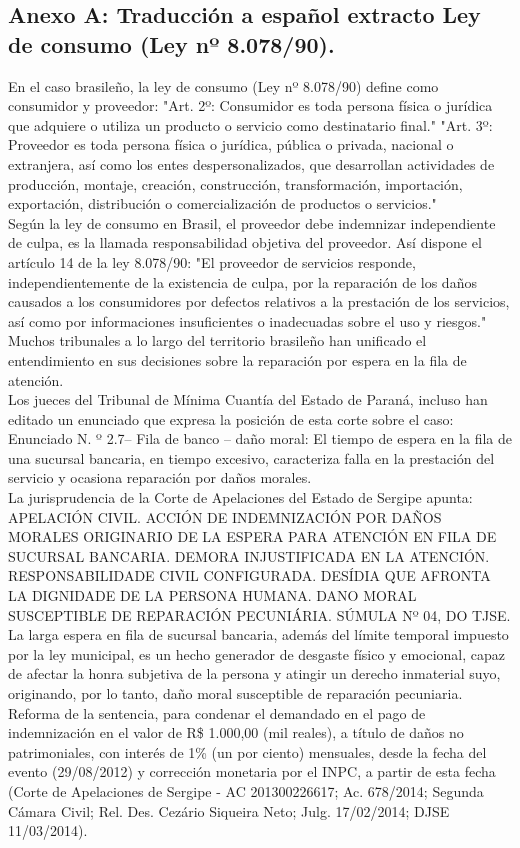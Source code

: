 \subsection*{Anexo A: Traducción a español extracto Ley de consumo (Ley nº 8.078/90).}

En el caso brasileño, la ley de consumo (Ley nº 8.078/90) define como consumidor y proveedor:
"Art. 2º: Consumidor es toda persona física o jurídica que adquiere o utiliza un producto o servicio como destinatario final."
"Art. 3º: Proveedor es toda persona física o jurídica, pública o privada, nacional o extranjera, así como los entes despersonalizados, que desarrollan actividades de producción, montaje, creación, construcción, transformación, importación, exportación, distribución o comercialización de productos o servicios."\\

Según la ley de consumo en Brasil, el proveedor debe indemnizar independiente de culpa, es la llamada responsabilidad objetiva del proveedor. Así dispone el artículo 14 de la ley 8.078/90: "El proveedor de servicios responde, independientemente de la existencia de culpa, por la reparación de los daños causados a los consumidores por defectos relativos a la prestación de los servicios, así como por informaciones insuficientes o inadecuadas sobre el uso y riesgos."\\

Muchos tribunales a lo largo del territorio brasileño han unificado el entendimiento en sus decisiones sobre la reparación por espera en la fila de atención.\\

Los jueces del Tribunal de Mínima Cuantía del Estado de Paraná, incluso han editado un enunciado que expresa la posición de esta corte sobre el caso:
Enunciado N. º 2.7– Fila de banco – daño moral: El tiempo de espera en la fila de una sucursal bancaria, en tiempo excesivo, caracteriza falla en la prestación del servicio y ocasiona reparación por daños morales.\\

La jurisprudencia de la Corte de Apelaciones del Estado de Sergipe apunta:
APELACIÓN CIVIL. ACCIÓN DE INDEMNIZACIÓN POR DAÑOS MORALES ORIGINARIO DE LA ESPERA PARA ATENCIÓN EN FILA DE SUCURSAL BANCARIA. DEMORA INJUSTIFICADA EN LA ATENCIÓN. RESPONSABILIDADE CIVIL CONFIGURADA. DESÍDIA QUE AFRONTA LA DIGNIDADE DE LA PERSONA HUMANA. DANO MORAL SUSCEPTIBLE DE REPARACIÓN PECUNIÁRIA. SÚMULA Nº 04, DO TJSE. La larga espera en fila de sucursal bancaria, además del límite temporal impuesto por la ley municipal, es un hecho generador de desgaste físico y emocional, capaz de afectar la honra subjetiva de la persona y atingir un derecho inmaterial suyo, originando, por lo tanto, daño moral susceptible de reparación pecuniaria. Reforma de la sentencia, para condenar el demandado en el pago de indemnización en el valor de R\$ 1.000,00 (mil reales), a título de daños no patrimoniales, con interés de 1\% (un por ciento) mensuales, desde la fecha del evento (29/08/2012) y corrección monetaria por el INPC, a partir de esta fecha (Corte de Apelaciones de Sergipe - AC 201300226617; Ac. 678/2014; Segunda Cámara Civil; Rel. Des. Cezário Siqueira Neto; Julg. 17/02/2014; DJSE 11/03/2014).\\
